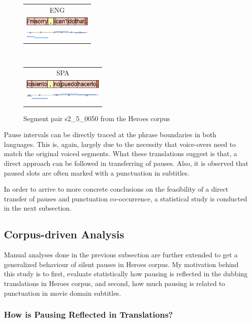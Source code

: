 \begin{figure}[h!]
\centering
\begin{tabular}{c}
ENG \\
\includegraphics[height=1.2cm]{img/s2_5_0050-EN.png} \\
\end{tabular}
\\
\begin{tabular}{c}
SPA \\
\includegraphics[height=1.2cm]{img/s2_5_0050-ES.png} \\
\end{tabular}
\caption{Segment pair s2\_5\_0050 from the Heroes corpus}
\label{figure:heroes_viz_4}
\end{figure}

Pause intervals can be directly traced at the phrase boundaries in both languages. This is, again, largely due to the necessity that voice-overs need to match the original voiced segments. What these translations suggest is that, a direct approach can be followed in transferring of pauses. Also, it is observed that paused slots are often marked with a punctuation in subtitles. 

In order to arrive to more concrete conclusions on the feasibility of a direct transfer of pauses and punctuation co-occurrence, a statistical study is conducted in the next subsection. 
 
\subsection{Corpus-driven Analysis}

Manual analyses done in the previous subsection are further extended to get a generalized behaviour of silent pauses in Heroes corpus. My motivation behind this study is to first, evaluate statistically how pausing is reflected in the dubbing translations in Heroes corpus, and second, how much pausing is related to punctuation in movie domain subtitles. 

\subsubsection{How is Pausing Reflected in Translations?}

